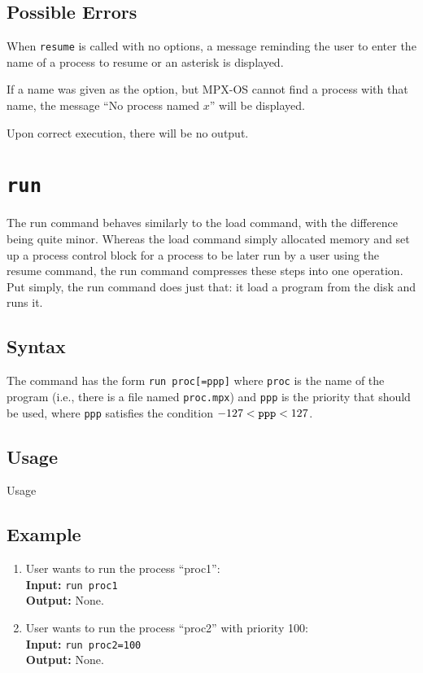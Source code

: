 \subsection{Possible Errors}

When {\tt resume} is called with no options, a message reminding the user to enter the
name of a process to resume or an asterisk is displayed.

If a name was given as the option, but MPX-OS cannot find a process with that name, the
message ``No process named $x$'' will be displayed.

Upon correct execution, there will be no output.





\section{\tt run}
\label{run_cmd}

The run command behaves similarly to the load command, with the difference being quite
minor. Whereas the load command simply allocated memory and set up a process control block
for a process to be later run by a user using the resume command, the run command
compresses these steps into one operation. Put simply, the run command does just that: it
load a program from the disk and runs it.

\subsection{Syntax}

The command has the form {\tt run proc[=ppp]} where {\tt proc} is the name of the program
(i.e., there is a file named {\tt proc.mpx}) and {\tt ppp} is the priority that should be
used, where {\tt ppp} satisfies the condition $-127 < {\tt ppp} < 127$.

\subsection{Usage}
Usage
\subsection{Example}
\begin{enumerate}
    \item User wants to run the process ``proc1'': \\
        {\bf Input:} {\tt run proc1} \\
        {\bf Output:} None.
    \item User wants to run the process ``proc2'' with priority 100: \\
        {\bf Input:} {\tt run proc2=100} \\
        {\bf Output:} None.
\end{enumerate}
